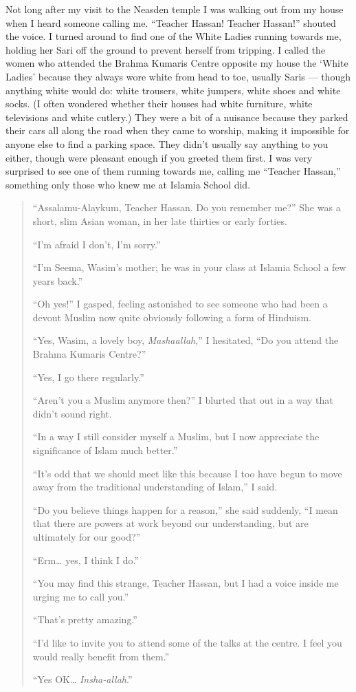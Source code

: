 \documentclass[12pt]{memoir}
\begin{document}
Not long after my visit to the Neasden temple I was walking out
from my house when I heard someone calling me.
“Teacher Hassan! Teacher Hassan!” shouted the voice.
I turned around to find one of the White Ladies running towards me,
holding her Sari off the ground to prevent herself from tripping.
I called the women who attended the Brahma Kumaris Centre opposite my house
the ‘White Ladies’ because they always wore white from head to toe,
usually Saris — though anything white would do:
white trousers, white jumpers, white shoes and white socks.
(I often wondered whether their houses had white furniture,
white televisions and white cutlery.)\@
They were a bit of a nuisance because they parked their cars
all along the road when they came to worship,
making it impossible for anyone else to find a parking space.
They didn’t usually say anything to you either,
though were pleasant enough if you greeted them first.
I was very surprised to see one of them running towards me,
calling me “Teacher Hassan,”
something only those who knew me at Islamia School did.

\begin{quote}
“Assalamu-Alaykum, Teacher Hassan.
Do you remember me?”
She was a short, slim Asian woman, in her late thirties or early forties.

“I’m afraid I don’t, I’m sorry.”

“I’m Seema, Wasim’s mother;
he was in your class at Islamia School a few years back.”

“Oh yes!” I gasped, feeling astonished to see someone
who had been a devout Muslim now quite obviously following a form of Hinduism.

“Yes, Wasim, a lovely boy, \emph{Mashaallah},” I hesitated,
“Do you attend the Brahma Kumaris Centre?”

“Yes, I go there regularly.”

“Aren’t you a Muslim anymore then?”
I blurted that out in a way that didn’t sound right.

“In a way I still consider myself a Muslim,
but I now appreciate the significance of Islam much better.”

“It’s odd that we should meet like this because I too have begun
to move away from the traditional understanding of Islam,” I said.

“Do you believe things happen for a reason,” she said suddenly,
“I mean that there are powers at work beyond our understanding,
but are ultimately for our good?”

“Erm… yes, I think I do.”

“You may find this strange, Teacher Hassan,
but I had a voice inside me urging me to call you.”

“That’s pretty amazing.”

“I’d like to invite you to attend some of the talks at the centre.
I feel you would really benefit from them.”

“Yes OK… \emph{Insha-allah}.”
\end{quote}
\end{document}
